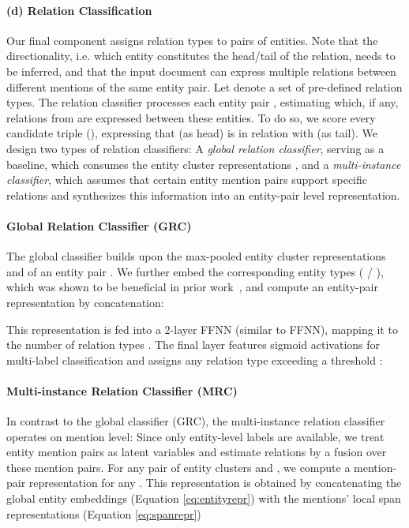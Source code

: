 \documentclass[11pt,a4paper]{article}
\begin{document}
\paragraph{(d) Relation Classification}
Our final component assigns relation types to pairs of entities.
Note that the directionality, i.e. which entity constitutes the head/tail of the relation, needs to be inferred, and that the input document can express multiple relations between different mentions of the same entity pair. Let  denote a set of pre-defined relation types. The relation classifier processes each entity pair , estimating which, if any, relations from  are expressed between these entities. To do so, we score every candidate triple (), expressing that  (as head) is in relation  with  (as tail).  We design two types of relation classifiers: A \emph{global relation classifier}, serving as a baseline, which consumes the entity cluster representations , and a \emph{multi-instance classifier}, which assumes that certain entity mention pairs support specific relations and synthesizes this information into an entity-pair level representation.

\paragraph{Global Relation Classifier (GRC)} The global classifier builds upon the max-pooled entity cluster representations  and  of an entity pair . We further embed the corresponding entity types ( / ), which was shown to be beneficial in prior work~\cite{yao:2019:docred}, and compute an entity-pair representation by concatenation:


This representation is fed into a 2-layer FFNN (similar to FFNN), mapping it to the number of relation types . The final layer features sigmoid activations for multi-label classification and assigns any relation type exceeding a threshold :



\paragraph{Multi-instance Relation Classifier (MRC)} In contrast to the global classifier (GRC), the multi-instance relation classifier operates on mention level: Since only entity-level labels are available, we treat entity mention pairs as latent variables and estimate relations by a fusion over these mention pairs. For any pair of entity clusters  and , we compute a mention-pair representation for any . This representation is obtained by concatenating the global entity embeddings (Equation \eqref{eq:entityrepr}) with the mentions' local span representations (Equation \eqref{eq:spanrepr})
\end{document}
